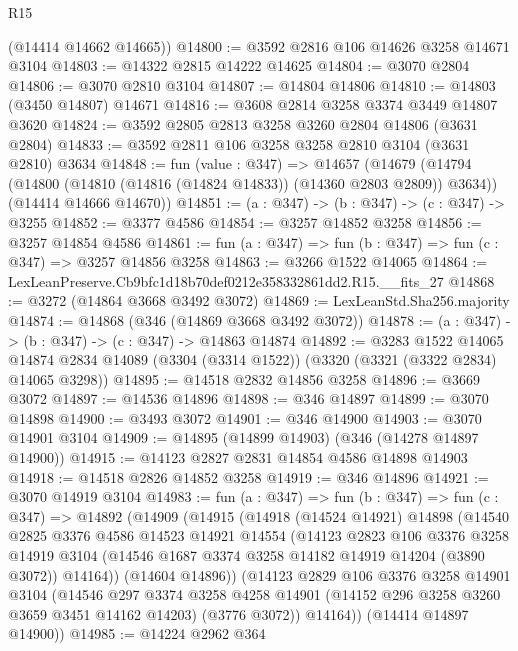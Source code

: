 \begin{lexlean}{R15}
\begin{coremodule}
      (@14414 @14662 @14665))
@14800 := @3592 @2816 @106 @14626 @3258 @14671 @3104
@14803 := @14322 @2815 @14222 @14625
@14804 := @3070 @2804
@14806 := @3070 @2810 @3104
@14807 := @14804 @14806
@14810 := @14803 (@3450 @14807) @14671
@14816 := @3608 @2814 @3258 @3374 @3449 @14807 @3620
@14824 := @3592 @2805 @2813 @3258 @3260 @2804 @14806 (@3631 @2804)
@14833 := @3592 @2811 @106 @3258 @3258 @2810 @3104 (@3631 @2810) @3634
@14848 := fun (value : @347) =>
  @14657
    (@14679
      (@14794 (@14800 (@14810 (@14816 (@14824 @14833)) (@14360 @2803 @2809)) @3634))
      (@14414 @14666 @14670))
@14851 := (a : @347) -> (b : @347) -> (c : @347) -> @3255
@14852 := @3377 @4586
@14854 := @3257 @14852 @3258
@14856 := @3257 @14854 @4586
@14861 := fun (a : @347) => fun (b : @347) => fun (c : @347) => @3257 @14856 @3258
@14863 := @3266 @1522 @14065
@14864 := LexLeanPreserve.Cb9bfc1d18b70def0212e358332861dd2.R15.__fits_27
@14868 := @3272 (@14864 @3668 @3492 @3072)
@14869 := LexLeanStd.Sha256.majority
@14874 := @14868 (@346 (@14869 @3668 @3492 @3072))
@14878 := (a : @347) -> (b : @347) -> (c : @347) -> @14863 @14874
@14892 := @3283
    @1522
    @14065
    @14874
    @2834
    @14089
    (@3304 (@3314 @1522))
    (@3320 (@3321 (@3322 @2834) @14065 @3298))
@14895 := @14518 @2832 @14856 @3258
@14896 := @3669 @3072
@14897 := @14536 @14896
@14898 := @346 @14897
@14899 := @3070 @14898
@14900 := @3493 @3072
@14901 := @346 @14900
@14903 := @3070 @14901 @3104
@14909 := @14895 (@14899 @14903) (@346 (@14278 @14897 @14900))
@14915 := @14123 @2827 @2831 @14854 @4586 @14898 @14903
@14918 := @14518 @2826 @14852 @3258
@14919 := @346 @14896
@14921 := @3070 @14919 @3104
@14983 := fun (a : @347) =>
  fun (b : @347) =>
  fun (c : @347) =>
  @14892
    (@14909
      (@14915
        (@14918
          (@14524 @14921)
          @14898
          (@14540
            @2825
            @3376
            @4586
            @14523
            @14921
            @14554
            (@14123
              @2823
              @106
              @3376
              @3258
              @14919
              @3104
              (@14546 @1687 @3374 @3258 @14182 @14919 @14204 (@3890 @3072))
              @14164))
          (@14604 @14896))
        (@14123
          @2829
          @106
          @3376
          @3258
          @14901
          @3104
          (@14546
            @297
            @3374
            @3258
            @4258
            @14901
            (@14152 @296 @3258 @3260 @3659 @3451 @14162 @14203)
            (@3776 @3072))
          @14164))
      (@14414 @14897 @14900))
@14985 := @14224 @2962 @364

\end{coremodule}
\end{lexlean}
